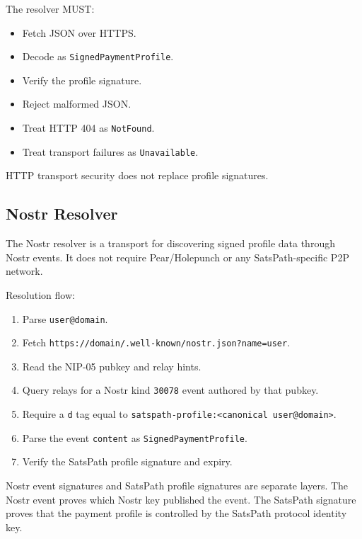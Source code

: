 \documentclass[
]{article}
\providecommand{\tightlist}{%
  \setlength{\itemsep}{0pt}\setlength{\parskip}{0pt}}
\begin{document}
The resolver MUST:

\begin{itemize}
\tightlist
\item
  Fetch JSON over HTTPS.
\item
  Decode as \texttt{SignedPaymentProfile}.
\item
  Verify the profile signature.
\item
  Reject malformed JSON.
\item
  Treat HTTP 404 as \texttt{NotFound}.
\item
  Treat transport failures as \texttt{Unavailable}.
\end{itemize}

HTTP transport security does not replace profile signatures.

\hypertarget{nostr-resolver}{%
\subsection{Nostr Resolver}\label{nostr-resolver}}

The Nostr resolver is a transport for discovering signed profile data
through Nostr events. It does not require Pear/Holepunch or any
SatsPath-specific P2P network.

Resolution flow:

\begin{enumerate}
\def\labelenumi{\arabic{enumi}.}
\tightlist
\item
  Parse \texttt{user@domain}.
\item
  Fetch \texttt{https://domain/.well-known/nostr.json?name=user}.
\item
  Read the NIP-05 pubkey and relay hints.
\item
  Query relays for a Nostr kind \texttt{30078} event authored by that
  pubkey.
\item
  Require a \texttt{d} tag equal to
  \texttt{satspath-profile:\textless{}canonical\ user@domain\textgreater{}}.
\item
  Parse the event \texttt{content} as \texttt{SignedPaymentProfile}.
\item
  Verify the SatsPath profile signature and expiry.
\end{enumerate}

Nostr event signatures and SatsPath profile signatures are separate
layers. The Nostr event proves which Nostr key published the event. The
SatsPath signature proves that the payment profile is controlled by the
SatsPath protocol identity key.
\end{document}
